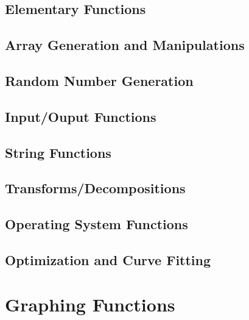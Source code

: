 \documentclass{book}
\begin{document}
\section{Elementary Functions}











\section{Array Generation and Manipulations}








\section{Random Number Generation}















\section{Input/Ouput Functions}















\section{String Functions}


\section{Transforms/Decompositions}




\section{Operating System Functions}






\section{Optimization and Curve Fitting}

\chapter{Graphing Functions}
\end{document}
